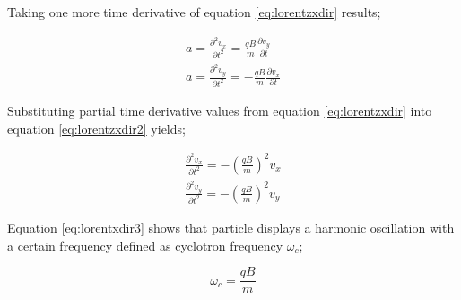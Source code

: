 Taking one more time derivative of equation \ref{eq:lorentzxdir} results;

\begin{equation}
    \begin{aligned}
        a = \frac{\partial^2 v_x}{\partial t^2} = \frac{qB}{m}\frac{\partial v_y}{\partial t} \\
        a = \frac{\partial^2 v_y}{\partial t^2} = -\frac{qB}{m}\frac{\partial v_x}{\partial t}
    \end{aligned}
    \label{eq:lorentzxdir2}
\end{equation}

Substituting partial time derivative values from equation \ref{eq:lorentzxdir} into equation \ref{eq:lorentzxdir2} yields;

\begin{equation}
    \begin{aligned}
        \frac{\partial^2 v_x}{\partial t^2} = - \left(\frac{qB}{m}\right)^2 v_x \\
        \frac{\partial^2 v_y}{\partial t^2} = - \left(\frac{qB}{m}\right)^2 v_y
    \end{aligned}
    \label{eq:lorentxdir3}
\end{equation}

Equation \ref{eq:lorentxdir3} shows that particle displays a harmonic oscillation with a certain frequency defined as cyclotron frequency $\omega_c$;

\begin{equation}
    \omega_c = \frac{qB}{m}
    \label{eq:cyclotronfreq}
\end{equation}







